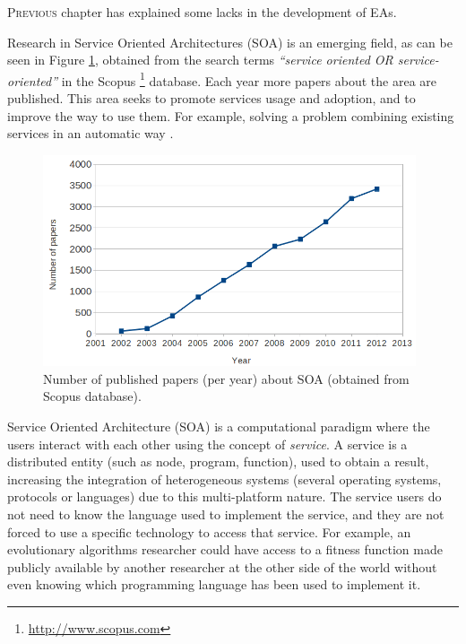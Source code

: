 \label{chap:soa}
\minitoc\mtcskip
\vfill
\lettrine{P}{revious} chapter has explained some lacks in the development of EAs.

Research in Service Oriented Architectures (SOA) \citep{Papazoglou2007SOA} is an emerging field, as can be seen in Figure \ref{fig:soapapers}, obtained from the search terms {\em ``service oriented OR service-oriented''} in the Scopus \footnote{\url{http://www.scopus.com}} database. Each year more papers about the area are published. This area seeks to promote services usage and adoption, and to improve the way to use them. For example, solving a problem combining existing services in an automatic way \citep{Moussa2010ServiceComposition}.





\begin{figure}
\centering
\includegraphics[width=26pc]{gfx/soa/papersYear.jpg}
\caption{Number of published papers (per year) about SOA (obtained from Scopus database).}
\label{fig:soapapers}
\end{figure}


Service Oriented Architecture (SOA) is a computational
paradigm where the users interact with each other using the concept of
{\em service}. A service is a distributed entity (such as node, program,
function), used to obtain a result, increasing the integration of heterogeneous
systems (several operating systems, protocols or languages) due to
this multi-platform nature. The service users do not need to know
the language used to implement the service, and they are not
forced to use a specific technology to access that service. For
example, an evolutionary algorithms researcher could have access to a
fitness function made publicly available by another researcher at the
other side of the world without even knowing which programming language
has been used to implement it.

